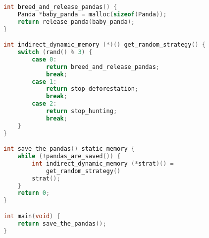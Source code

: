 \noindent\begin{minipage}[t]{\linewidth}
\begin{lstlisting}[language=C,caption={Same example program as Listing \ref{lst:rules:ptreg} but with function pointer type annotations inserted},label={lst:rules:pandaptrannote}]
int breed_and_release_pandas() {
    Panda *baby_panda = malloc(sizeof(Panda));
    return release_panda(baby_panda);
}

int indirect_dynamic_memory (*)() get_random_strategy() {
    switch (rand() % 3) {
        case 0:
            return breed_and_release_pandas;
            break;
        case 1:
            return stop_deforestation;
            break;
        case 2:
            return stop_hunting;
            break;
    }
}

int save_the_pandas() static_memory {
    while (!pandas_are_saved()) {
        int indirect_dynamic_memory (*strat)() =
            get_random_strategy()
        strat();
    }
    return 0;
}

int main(void) {
    return save_the_pandas();
}
\end{lstlisting}
\end{minipage}

